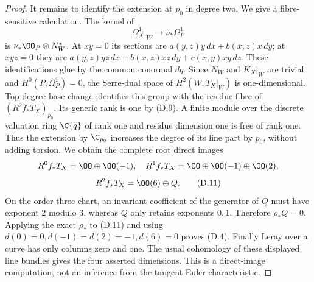 \begin{proof}
It remains to identify the extension at $p_0$ in degree two. We give
a fibre-sensitive calculation. The kernel of
\[
 \Omega_X^1|_W\longrightarrow\nu_*\Omega_P^1
\]
is $\nu_*\OO_P\otimes N_W^*$. At $xy=0$ its sections are
$a(y,z)y\,dx+b(x,z)x\,dy$; at $xyz=0$ they are
$a(y,z)yz\,dx+b(x,z)xz\,dy+c(x,y)xy\,dz$.
These identifications glue by the common conormal $dq$.
Since $N_W$ and $K_X|_W$ are trivial and $H^0(P,\Omega_P^1)=0$, the
Serre-dual space of $H^2(W,T_X|_W)$ is one-dimensional.
Top-degree base change identifies this group with the residue fibre
of $(R^2\bar f_*T_X)_{p_0}$. Its generic rank is one by (D.9).
A finite module over the discrete valuation ring $\C\{q\}$ of rank
one and residue dimension one is free of rank one. Thus the extension
by $\C_{p_0}$ increases the degree of its line part by $p_0$, without
adding torsion. We obtain the complete root direct images
\[
 R^0\bar f_*T_X=\OO\oplus\OO(-1),\quad
 R^1\bar f_*T_X=\OO\oplus\OO(-1)\oplus\OO(2),
\]
\[
 R^2\bar f_*T_X=\OO(6)\oplus Q.                       \tag{D.11}
\]
On the order-three chart, an invariant coefficient of the generator
of $Q$ must have exponent $2$ modulo $3$, whereas $Q$ only retains
exponents $0,1$. Therefore $\rho_*Q=0$. Applying the exact $\rho_*$
to (D.11) and using
$d(0)=0,d(-1)=d(2)=-1,d(6)=0$ proves (D.4).
Finally Leray over a curve has only columns zero and one. The usual
cohomology of these displayed line bundles gives the four asserted
dimensions. This is a direct-image computation, not an inference from
the tangent Euler characteristic.
\end{proof}
